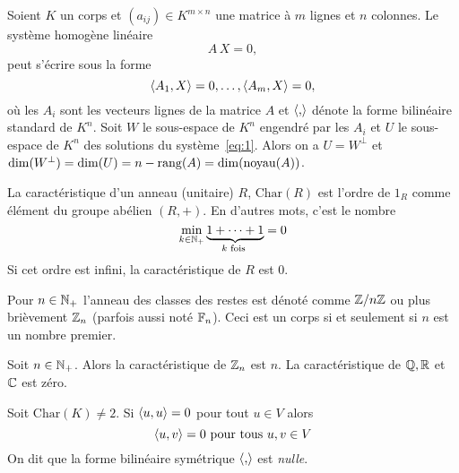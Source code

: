 \begin{example}
  \label{exe:2}
  Soient $K$ un corps et $(a_{ij}) \in K^{m\times n}$ une matrice à $m$ lignes et $n$ colonnes. Le système homogène linéaire 
  \begin{equation}
    \label{eq:1}
    A\,X = 0,
  \end{equation}
  peut s'écrire sous la forme 
  \begin{displaymath}
    \langle {A_1,X} \rangle=0, \dots ,\langle {A_m,X} \rangle=0, 
  \end{displaymath}
  où les $A_i$  sont les vecteurs lignes de la matrice $A$ et $\langle {,} \rangle$ dénote la forme bilinéaire standard de $K^n$. Soit $W$ le sous-espace de $K^n$ engendré par les $A_i$ et $U$ le sous-espace de $K^n$ des solutions du système~\eqref{eq:1}. Alors on a  $U = W^\perp$ et $\dim(W^\perp) = \dim(U) = n - \operatorname{rang}(A) = \dim(\operatorname{noyau}(A))$. 
  
 \end{example}




\begin{definition}
  \label{def:8}
  La caractéristique d'un anneau (unitaire) $R$, $\mathrm{Char}(R)$ 
  est l'ordre de $1_R$
  comme élément du groupe abélien $(R,+)$.
  En d'autres mots, c'est le nombre 
  \begin{displaymath}
    \min_{k \in \mathbb{N}_+} \underbrace{1+ \cdots + 1}_{k \text{ fois }} = 0
  \end{displaymath}
  Si cet ordre est infini, la caractéristique de $R$ est $0$.
\end{definition}

\begin{notation}
  Pour $n \in \mathbb{N}_+$ l'anneau des classes des restes est dénoté comme
  $\mathbb{Z} / n \mathbb{Z}$ ou plus brièvement $\mathbb{Z}_n$ (parfois aussi noté $\Bbb F_n$). Ceci est un corps si et seulement si $n$ est un nombre premier. 
\end{notation}

\begin{example}
\label{exe:10}
   Soit $n \in \mathbb{N}_+$. Alors la  caractéristique de $\mathbb{Z}_n$ est $n$. 
   La caractéristique de $\mathbb{Q},\mathbb{R}$ et $\mathbb{C}$ est zéro.    
\end{example}

\begin{lemma}
  \label{lem:1}
 Soit $\mathrm{Char}(K)\neq 2$. Si $\langle {u,u} \rangle=0$ pour tout $u \in V$ alors 
  \begin{displaymath}
    \langle {u,v} \rangle=0 \text{ pour tous }u,v \in V
  \end{displaymath}
On dit que la forme bilinéaire symétrique $\langle {,} \rangle$ est  \emph{nulle}. 
\end{lemma}

